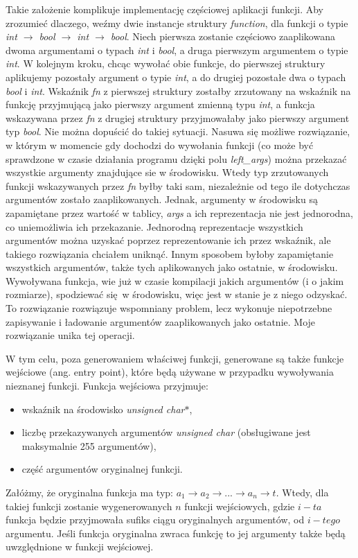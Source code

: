 \documentclass[declaration,shortabstract]{iithesis}
\begin{document}
Takie założenie komplikuje implementację częściowej aplikacji funkcji. Aby 
zrozumieć dlaczego, weźmy dwie instancje struktury \textit{function}, dla 
funkcji o typie \textit{int $\rightarrow$ bool $\rightarrow$ int 
$\rightarrow$ bool}. Niech pierwsza zostanie częściowo zaaplikowana dwoma 
argumentami o typach \textit{int} i \textit{bool}, a druga pierwszym argumentem
o typie \textit{int}. W kolejnym kroku, chcąc wywołać obie funkcje, do 
pierwszej struktury aplikujemy pozostały argument o typie \textit{int}, a do 
drugiej pozostałe dwa o typach \textit{bool} i \textit{int}. Wskaźnik \textit
{fn} z pierwszej struktury zostałby zrzutowany na wskaźnik na funkcję 
przyjmującą jako pierwszy argument zmienną typu \textit{int}, a funkcja 
wskazywana przez \textit{fn} z drugiej struktury przyjmowałaby jako pierwszy 
argument typ \textit{bool}. Nie można dopuścić do takiej sytuacji. Nasuwa się 
możliwe rozwiązanie, w którym w momencie gdy dochodzi do wywołania funkcji (co 
może być sprawdzone w czasie działania programu dzięki polu 
\textit{left\_args}) można przekazać wszystkie argumenty znajdujące sie w 
środowisku. Wtedy typ zrzutowanych funkcji wskazywanych przez \textit{fn} byłby 
taki sam, niezależnie od tego ile dotychczas argumentów zostało zaaplikowanych.
Jednak, argumenty w środowisku są zapamiętane przez wartość w tablicy, \textit
{args} a ich reprezentacja nie jest jednorodna, co uniemożliwia ich przekazanie.
Jednorodną reprezentacje wszystkich argumentów można uzyskać poprzez 
reprezentowanie ich przez wskaźnik, ale takiego rozwiązania chciałem uniknąć.
Innym sposobem byłoby zapamiętanie wszystkich argumentów, także tych 
aplikowanych jako ostatnie, w środowisku. Wywoływana funkcja, wie już w czasie 
kompilacji jakich argumentów (i o jakim rozmiarze), spodziewać się w środowisku,
więc jest w stanie je z niego odzyskać. To rozwiązanie rozwiązuje wspomniany 
problem, lecz wykonuje niepotrzebne zapisywanie i ładowanie argumentów 
zaaplikowanych jako ostatnie. Moje rozwiązanie unika tej operacji. 

W tym celu, poza generowaniem właściwej funkcji, generowane są także funkcje 
wejściowe (ang. entry point), które będą używane w przypadku wywoływania 
nieznanej funkcji. 
Funkcja wejściowa przyjmuje: 
\begin{itemize}
  \item wskaźnik na środowisko \textit{unsigned char$\ast$},
  \item liczbę przekazywanych argumentów \textit{unsigned char} 
  (obsługiwane jest maksymalnie 255 argumentów),
  \item część argumentów oryginalnej funkcji.
\end{itemize}
Załóżmy, że oryginalna funkcja ma typ: $a_1 \rightarrow a_2 \rightarrow ...
\rightarrow a_n \rightarrow t$. Wtedy, dla takiej funkcji zostanie wygenerowanych $n$ funkcji 
wejściowych, gdzie $i-ta$ funkcja będzie przyjmowała sufiks ciągu oryginalnych
argumentów, od $i-tego$ argumentu. Jeśli funkcja oryginalna zwraca funkcję to 
jej argumenty także będą uwzględnione w funkcji wejściowej.
\end{document}
